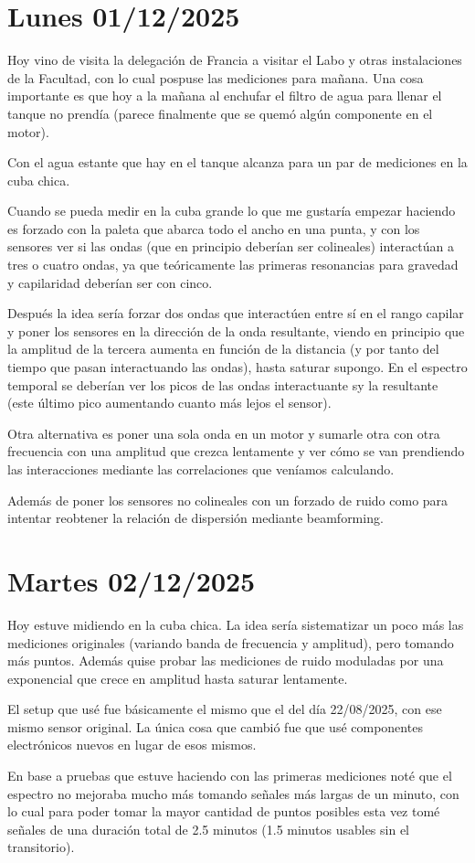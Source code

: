 
\section{Lunes 01/12/2025} 
Hoy vino de visita la delegación de Francia a visitar el Labo y otras instalaciones de la Facultad, con lo cual pospuse las mediciones para mañana. Una cosa importante es que hoy a la mañana al enchufar el filtro de agua para llenar el tanque no prendía (parece finalmente que se quemó algún componente en el motor). 

Con el agua estante que hay en el tanque alcanza para un par de mediciones en la cuba chica. 

Cuando se pueda medir en la cuba grande lo que me gustaría empezar haciendo es forzado con la paleta que abarca todo el ancho en una punta, y con los sensores ver si las ondas (que en principio deberían ser colineales) interactúan a tres o cuatro ondas, ya que teóricamente las primeras resonancias para gravedad y capilaridad deberían ser con cinco. 

Después la idea sería forzar dos ondas que interactúen entre sí en el rango capilar y poner los sensores en la dirección de la onda resultante, viendo en principio que la amplitud de la tercera aumenta en función de la distancia (y por tanto del tiempo que pasan interactuando las ondas), hasta saturar supongo. En el espectro temporal se deberían ver los picos de las ondas interactuante sy la resultante (este último pico aumentando cuanto más lejos el sensor). 

Otra alternativa es poner una sola onda en un motor y sumarle otra con otra frecuencia con una amplitud que crezca lentamente y ver cómo se van prendiendo las interacciones mediante las correlaciones que veníamos calculando.  

Además de poner los sensores no colineales con un forzado de ruido como para intentar reobtener la relación de dispersión mediante beamforming. 

\section{Martes 02/12/2025} 
Hoy estuve midiendo en la cuba chica. La idea sería sistematizar un poco más las mediciones originales (variando banda de frecuencia y amplitud), pero tomando más puntos. Además quise probar las mediciones de ruido moduladas por una exponencial que crece en amplitud hasta saturar lentamente. 

El setup que usé fue básicamente el mismo que el del día 22/08/2025, con ese mismo sensor original. La única cosa que cambió fue que usé componentes electrónicos nuevos en lugar de esos mismos. 

En base a pruebas que estuve haciendo con las primeras mediciones noté que el espectro no mejoraba mucho más tomando señales más largas de un minuto, con lo cual para poder tomar la mayor cantidad de puntos posibles esta vez tomé señales de una duración total de 2.5 minutos (1.5 minutos usables sin el transitorio). 







